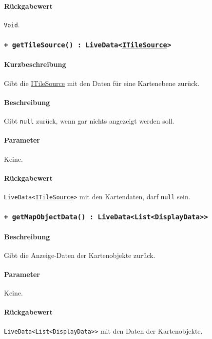 \paragraph*{Rückgabewert}
\texttt{Void}.

\subsubsection*{\texttt{+ getTileSource() : LiveData<\href{https://osmdroid.github.io/osmdroid/javadocAll/org/osmdroid/tileprovider/tilesource/ITileSource.html}{ITileSource}>}}\label{App_Map_ViewModel_getTileSource}%
\paragraph*{Kurzbeschreibung}
Gibt die \href{https://osmdroid.github.io/osmdroid/javadocAll/org/osmdroid/tileprovider/tilesource/ITileSource.html}
{ITileSource} mit den Daten für eine Kartenebene zurück.
\paragraph*{Beschreibung}
Gibt \texttt{null} zurück, wenn gar nichts angezeigt werden soll.
\paragraph*{Parameter}
Keine.
\paragraph*{Rückgabewert}
\texttt{LiveData<\href{https://osmdroid.github.io/osmdroid/javadocAll/org/osmdroid/tileprovider/tilesource/ITileSource.html}
{ITileSource}>} mit den Kartendaten, darf \texttt{null} sein.

\subsubsection*{\texttt{+ getMapObjectData() : LiveData<List<DisplayData>>}}\label{App_Map_ViewModel_getMapObjectData}%
\paragraph*{Beschreibung}
Gibt die Anzeige-Daten der Kartenobjekte zurück.
\paragraph*{Parameter}
Keine.
\paragraph*{Rückgabewert}
\texttt{LiveData<List<DisplayData>>} mit den Daten der Kartenobjekte.

